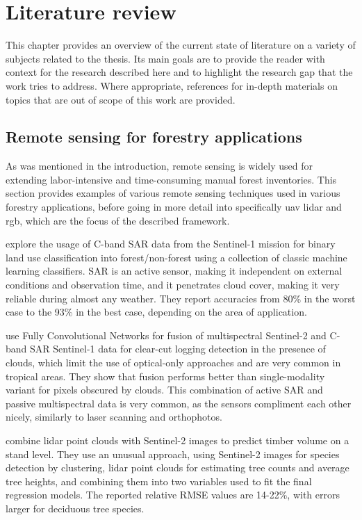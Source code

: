 \chapter{Literature review}\label{cap:literature}

This chapter provides an overview of the current state of literature on a variety of subjects related to the thesis.
Its main goals are to provide the reader with context for the research described here and to highlight the research gap that the work tries to address.
Where appropriate, references for in-depth materials on topics that are out of scope of this work are provided.

\section{Remote sensing for forestry applications}

As was mentioned in the introduction, remote sensing is widely used for extending labor-intensive and time-consuming manual forest inventories.
This section provides examples of various remote sensing techniques used in various forestry applications, before going in more detail into specifically \gls{uav} \gls{lidar} and \gls{rgb}, which are the focus of the described framework.

\citet{hansenAssessingForestNonForest2020} explore the usage of C-band SAR data from the Sentinel-1 mission for binary land use classification into forest/non-forest using a collection of classic machine learning classifiers.
SAR is an active sensor, making it independent on external conditions and observation time, and it penetrates cloud cover, making it very reliable during almost any weather.
They report accuracies from 80\% in the worst case to the 93\% in the best case, depending on the area of application.

\citet{ferrariFusingSentinel1Sentinel22023} use Fully Convolutional Networks \citep{longFullyConvolutionalNetworks2015} for fusion of multispectral Sentinel-2 and C-band SAR Sentinel-1 data for clear-cut logging detection in the presence of clouds, which limit the use of optical-only approaches and are very common in tropical areas.
They show that fusion performs better than single-modality variant for pixels obscured by clouds.
This combination of active SAR and passive multispectral data is very common, as the sensors compliment each other nicely, similarly to laser scanning and orthophotos.

\citet{sinica-sinavskisForestStandVolume2022} combine \gls{lidar} point clouds with Sentinel-2 images to predict timber volume on a stand level.
They use an unusual approach, using Sentinel-2 images for species detection by clustering, \gls{lidar} point clouds for estimating tree counts and average tree heights, and combining them into two variables used to fit the final regression models.
The reported relative RMSE values are 14-22\%, with errors larger for deciduous tree species.

